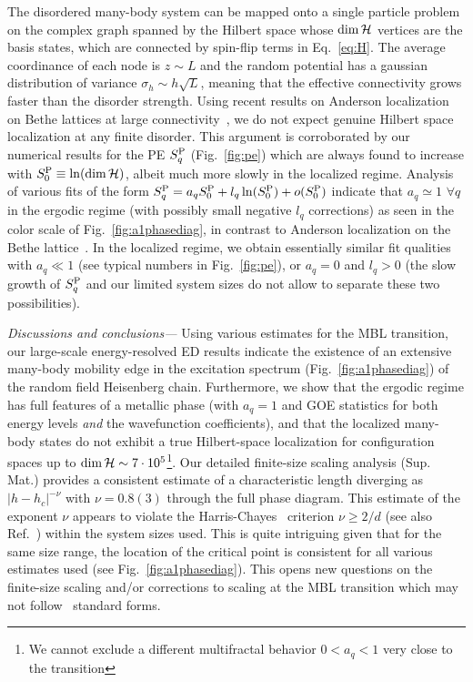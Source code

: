 \documentclass[prl,a4paper,twocolumn,groupedaddress,english,showpacs]{revtex4-1}
\begin{document}
The disordered many-body system can be mapped onto a single particle problem on the complex
graph spanned by the Hilbert space whose $\dim{\cal H}$ vertices are the basis states, which are
connected by spin-flip terms in Eq.~\eqref{eq:H}. The average coordinance of each node is $z\sim L$
and the random potential has a gaussian distribution of variance $\sigma_h\sim h\sqrt L$, meaning
that the effective connectivity grows faster than the disorder strength. Using recent results on
Anderson localization on Bethe lattices at large connectivity~\cite{biroli_anderson_2010}, we do not
expect genuine Hilbert space localization at any finite disorder. This argument is corroborated by our
numerical results for the PE $S_q^{\rm P}$ (Fig.~\ref{fig:pe}) which are always found to increase
with $S_0^{\rm P} \equiv \ln(\dim{\cal H})$, albeit much more slowly in the localized regime. Analysis
of various fits of the form  $S_q^{\rm P}=a_q S_0^{\rm P}+l_q \ln (S_0^{\rm P})+o(S_0^{\rm P})$
indicate that $a_q \simeq 1$  $\forall q$ in the ergodic regime (with possibly small negative $l_q$
corrections) as seen in the color scale of Fig.~\ref{fig:a1phasediag}, in contrast to Anderson
localization on the Bethe lattice~\cite{de_luca_anderson_2014}. In the localized regime, we
obtain essentially similar fit qualities with $a_q \ll 1$ (see typical numbers in
Fig.~\ref{fig:pe}), or $a_q=0$ and $l_q>0$ (the slow growth of  $S_q^{\rm P}$ and our limited system
sizes do not allow to separate these two possibilities). 


{\it{Discussions and conclusions---}} Using various estimates for the MBL transition, our
large-scale energy-resolved ED results indicate the existence of an extensive many-body mobility edge in the excitation spectrum (Fig.~\ref{fig:a1phasediag}) of the random field Heisenberg chain. Furthermore, we
show that the ergodic regime has full features of a metallic phase (with $a_q=1$ and GOE statistics
for both energy levels \emph{and} the wavefunction coefficients), and that the localized
many-body states do not exhibit a true Hilbert-space localization for configuration spaces
up to $\dim{\cal H} \sim 7\cdot 10^5$\footnote{We cannot exclude a different multifractal behavior
$0<a_q<1$ very close to the transition}. Our detailed finite-size scaling analysis (Sup. Mat.)
provides a consistent estimate of
a characteristic length diverging as $|h-h_c|^{-\nu}$ with $\nu=0.8(3)$ through the full phase
diagram. This estimate of the exponent $\nu$ appears to violate the Harris-Chayes~\cite{harris_effect_1974,chayes_finite_1986} criterion $\nu
\geq 2/d$ (see also Ref.~\cite{kjall_many-body_2014}) within the system sizes used. This is quite intriguing given that for the same size range, the location of the critical point is consistent for all various estimates used (see Fig.~\ref{fig:a1phasediag}). This opens new questions on the finite-size scaling and/or corrections to scaling at the MBL transition which may not follow~\cite{oganesyan_localization_2007,pal_many-body_2010} standard forms.
\end{document}
